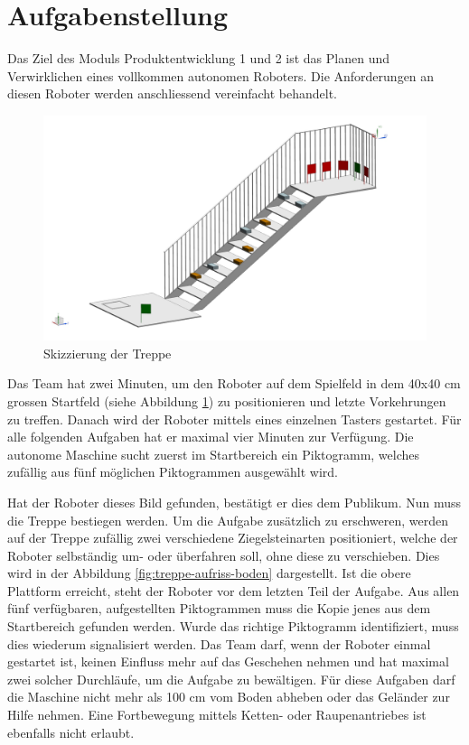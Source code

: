 \newpage
\section{Aufgabenstellung}

Das Ziel des Moduls Produktentwicklung 1 und 2 ist das Planen und Verwirklichen eines vollkommen autonomen Roboters. Die Anforderungen an diesen Roboter werden anschliessend vereinfacht behandelt. 
 
\begin{figure}[H]
  \includegraphics[width=1\textwidth]{img/Aufgabenstellung/Aufgabenstellung.png}
  \centering
  \caption{Skizzierung der Treppe}
  \label{fig:seitenansicht-treppe}
\end{figure}
 
Das Team hat zwei Minuten, um den Roboter auf dem Spielfeld in dem 40x40 cm grossen 
Startfeld (siehe Abbildung \ref{fig:seitenansicht-treppe}) zu positionieren und letzte Vorkehrungen zu treffen. Danach wird der Roboter mittels eines einzelnen Tasters gestartet. 
Für alle folgenden Aufgaben hat er maximal vier Minuten zur Verfügung. 
Die autonome Maschine sucht zuerst im Startbereich ein Piktogramm, welches zufällig aus fünf möglichen Piktogrammen ausgewählt wird.

\newpage

Hat der Roboter dieses Bild gefunden, bestätigt er dies dem Publikum. Nun muss die Treppe bestiegen werden. Um die Aufgabe zusätzlich zu erschweren, werden auf der Treppe zufällig zwei verschiedene Ziegelsteinarten positioniert, welche der Roboter selbständig um- oder überfahren soll, ohne diese zu verschieben. Dies wird in der Abbildung \ref{fig:treppe-aufriss-boden} dargestellt. Ist die obere Plattform erreicht, steht der Roboter vor dem letzten Teil der Aufgabe. Aus allen fünf verfügbaren, aufgestellten Piktogrammen muss die Kopie jenes aus dem Startbereich gefunden werden. Wurde das richtige Piktogramm identifiziert, muss dies wiederum signalisiert werden. Das Team darf, wenn der Roboter einmal gestartet ist, keinen Einfluss mehr auf das Geschehen nehmen und hat maximal zwei solcher Durchläufe,
um die Aufgabe zu bewältigen. Für diese Aufgaben darf die Maschine nicht mehr als 100 cm vom Boden abheben oder das Geländer zur Hilfe nehmen. Eine Fortbewegung mittels Ketten- oder Raupenantriebes ist ebenfalls nicht erlaubt.

